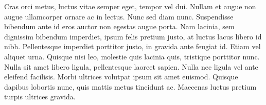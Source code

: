 Cras orci metus, luctus vitae semper eget, tempor vel dui. Nullam et augue non augue ullamcorper ornare ac in lectus. Nunc sed diam nunc. Suspendisse bibendum ante id eros auctor non egestas augue porta. Nam lacinia, sem dignissim bibendum imperdiet, ipsum felis pretium justo, at luctus lacus libero id nibh. Pellentesque imperdiet porttitor justo, in gravida ante feugiat id. Etiam vel aliquet urna. Quisque nisi leo, molestie quis lacinia quis, tristique porttitor nunc. Nulla sit amet libero ligula, pellentesque laoreet sapien. Nulla nec ligula vel ante eleifend facilisis. Morbi ultrices volutpat ipsum sit amet euismod. Quisque dapibus lobortis nunc, quis mattis metus tincidunt ac. Maecenas luctus pretium turpis ultrices gravida.
